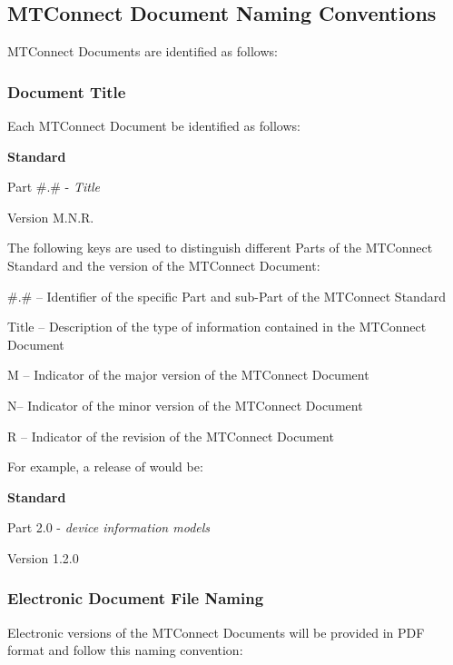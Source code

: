 \newpage

\subsection{MTConnect Document Naming Conventions}

MTConnect Documents are identified as follows:

\subsubsection{Document Title}

Each MTConnect Document \MUST be identified as follows:

\newline \centerline{\large{\textbf{\mtconnectregistered Standard}}}
\newline \centerline{Part \#.\# - \textit{Title}}
\newline \centerline{Version M.N.R.}

The following keys are used to distinguish different Parts of the MTConnect Standard and the version of the MTConnect Document:

\tab	\#.\# -- Identifier of the specific Part and sub-Part of the MTConnect Standard 
	
\tab	Title -- Description of the type of information contained in the MTConnect Document
	
\tab	M -- Indicator of the \gls{major} version of the MTConnect Document
	
\tab	N-- Indicator of the \gls{minor} version of the MTConnect Document
	
\tab	R -- Indicator of the revision of the MTConnect Document

For example, a release of  would be:

\newline \centerline{\large{\textbf{\mtconnectregistered Standard}}}
\newline \centerline{Part 2.0 - \textit{\glspl{device information model}}}
\newline \centerline{Version 1.2.0}

\subsubsection{Electronic Document File Naming}

Electronic versions of the MTConnect Documents will be provided in PDF format and follow this naming convention:

